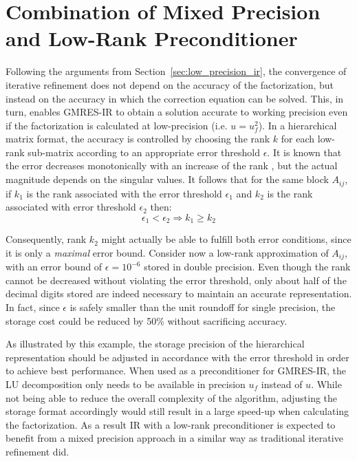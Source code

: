 \section{Combination of Mixed Precision and Low-Rank Preconditioner}
\label{sec:combinded_ir}

Following the arguments from Section~\hyperref[sec:low_precision_ir]{\ref{sec:low_precision_ir}}, the convergence of iterative refinement does not depend on the accuracy of the factorization, but instead on the accuracy in which the correction equation can be solved. This, in turn, enables GMRES-IR to obtain a solution accurate to working precision even if the factorization is calculated at low-precision (i.e. $u=u_f^2$). In a hierarchical matrix format, the accuracy is controlled by choosing the rank $k$ for each low-rank sub-matrix according to an appropriate error threshold $\epsilon$. It is known that the error decreases monotonically with an increase of the rank \cite{eckart_approximation_1936}, but the actual magnitude depends on the singular values. It follows that for the same block $A_{ij}$, if $k_1$ is the rank associated with the error threshold $\epsilon_1$ and $k_2$ is the rank associated with error threshold $\epsilon_2$ then:
\begin{equation}
    \epsilon_1 < \epsilon_2 \Rightarrow k_1 \geq k_2
\end{equation}

\noindent Consequently, rank $k_2$ might actually be able to fulfill both error conditions, since it is only a \textit{maximal} error bound. Consider now a low-rank approximation of $A_{ij}$, with an error bound of $\epsilon=10^{-6}$ stored in double precision. Even though the rank cannot be decreased without violating the error threshold, only about half of the decimal digits stored are indeed necessary to maintain an accurate representation. In fact, since $\epsilon$ is safely smaller than the unit roundoff for single precision, the storage cost could be reduced by 50\% without sacrificing accuracy.

As illustrated by this example, the storage precision of the hierarchical representation should be adjusted in accordance with the error threshold in order to achieve best performance. When used as a preconditioner for GMRES-IR, the LU decomposition only needs to be available in precision $u_f$ instead of $u$. While not being able to reduce the overall complexity of the algorithm, adjusting the storage format accordingly would still result in a large speed-up when calculating the factorization. As a result IR with a low-rank preconditioner is expected to benefit from a mixed precision approach in a similar way as traditional iterative refinement did.

